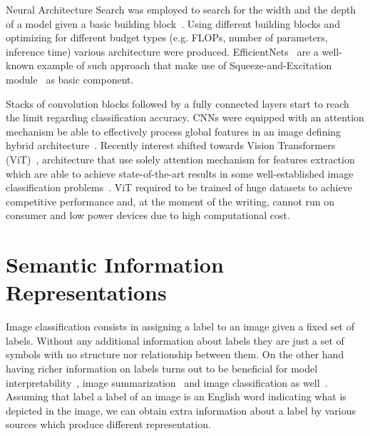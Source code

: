 Neural Architecture Search was employed to search for the width and the depth
of a model given a basic building block~\cite{ProgressiveNeuLiuC2017,
GeneticCnnXieL2017, LargeScaleEvoReal2017, RegularizedEvoReal2018}. Using
different building blocks and optimizing for different budget types (e.g.
FLOPs, number of parameters, inference time) various architecture were
produced. EfficientNets~\cite{EfficientnetRTanM2019, Efficientnetv2TanM2021}
are a well-known example of such approach that make use of
Squeeze-and-Excitation module~\cite{SqueezeAndExcHuJi2017} as basic component.

Stacks of convolution blocks followed by a fully connected layers start to
reach the limit regarding classification accuracy. CNNs were equipped with an
attention mechanism be able to effectively process global features in an image
defining hybrid architecture~\cite{SpatialTransfoJaderb2015,
LookAndThinkCaoC2015, ShowAttendAnXuKe2015, ScaCnnSpatiaChen2016}. Recently
interest shifted towards Vision Transformers
(ViT)~\cite{AnImageIsWorDosovi2020}, architecture that use solely attention
mechanism for features extraction which are able to achieve state-of-the-art
results in some well-established image classification
problems~\cite{TransformersInKhan2021, ASurveyOnVisHanK2023}. ViT required to
be trained of huge datasets to achieve competitive performance and, at the
moment of the writing, cannot run on consumer and low power devices due to high
computational cost.

\section{Semantic Information Representations}
\label{sec:semantic-information-sources}
Image classification consists in assigning a label to an image given a fixed
set of labels. Without any additional information about labels they are just a
set of symbols with no structure nor relationship between them. On the other
hand having richer information on labels turns out to be beneficial for model
interpretability~\cite{ImprovingInterDong2017}, image
summarization~\cite{SemanticImagePasini2022} and image classification as
well~\cite{MakingBetterMBertin2019}. Assuming that label a label of an image is
an English word indicating what is depicted in the image, we can obtain extra
information about a label by various sources which produce different representation.

